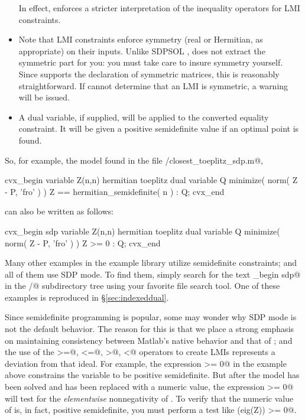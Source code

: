 \documentclass[12pt]{article}
\begin{document}
\begin{itemize}
\begin{center}
\begin{tabular}{cccc}
      \end{tabular}
      \end{center}
      In effect, \cvx enforces a stricter interpretation of the inequality
      operators for LMI constraints.
\item Note that LMI constraints enforce symmetry (real or Hermitian, as
      appropriate) on their inputs. Unlike SDPSOL \cite{SDPSOL}, \cvx 
      does not extract the symmetric part for you: you must take
      care to insure symmetry yourself. Since \cvx supports the declaration
      of symmetric matrices, this is reasonably straightforward. If \cvx cannot
      determine that an LMI is symmetric, a warning will be issued.      
\item A dual variable, if supplied, will be applied to the converted
      equality constraint. It will be given a 
      positive semidefinite value if an optimal point is found.
\end{itemize}
So, for example, the \cvx model found in the file
\verb@examples/closest_toeplitz_sdp.m@,
\begin{code}
cvx_begin
    variable Z(n,n) hermitian toeplitz
    dual variable Q
    minimize( norm( Z - P, 'fro' ) )
    Z == hermitian_semidefinite( n ) : Q;
cvx_end
\end{code}
can also be written as follows:
\begin{code}
cvx_begin sdp
    variable Z(n,n) hermitian toeplitz
    dual variable Q
    minimize( norm( Z - P, 'fro' ) )
    Z >= 0 : Q;
cvx_end
\end{code}
Many other examples in the \cvx example library utilize semidefinite
constraints; and all of them use SDP mode. To find them, simply 
search for the text \verb@cvx_begin sdp@ in the \verb@examples/@
subdirectory tree using your favorite file search tool. One
of these examples is reproduced in \S\ref{sec:indexeddual}.

Since semidefinite programming is popular, some
may wonder why SDP mode is not the default behavior.
The reason for this is that we place a
strong emphasis on maintaining consistency between Matlab's native
behavior and that of \cvx; and 
the use of the \verb@>=@, \verb@<=@, \verb@>@, \verb@<@
operators to create LMIs
represents a deviation from that ideal.
For example, the expression \verb@Z >= 0@ in the example above constrains
the variable \verb@Z@ to be positive semidefinite. But after the model has been solved
and \verb@Z@ has been replaced with a numeric value,
the expression \verb@Z >= 0@ will test for the \emph{elementwise}
nonnegativity of \verb@Z@. To verify that the numeric value
of \verb@Z@ is, in fact, positive semidefinite, you must perform
a test like \verb@min(eig(Z)) >= 0@.
\end{document}
